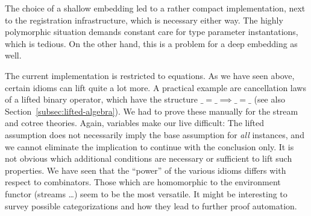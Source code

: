 The choice of a shallow embedding led to a rather compact implementation,
next to the registration infrastructure, which is necessary either way.
The highly polymorphic situation demands constant care for type parameter
instantations, which is tedious.
On the other hand, this is a problem for a deep embedding as well.

The current implementation is restricted to equations.
As we have seen above, certain idioms can lift quite a lot more.
A practical example are cancellation laws of a lifted binary operator, which
have the structure $\_ = \_ \implies \_ = \_$ (see also
Section~\ref{subsec:lifted-algebra}).
We had to prove these manually for the stream and cotree theories.
Again, variables make our live difficult:
The lifted assumption does not necessarily imply the base assumption for
\emph{all} instances, and we cannot eliminate the implication to continue
with the conclusion only.
It is not obvious which additional conditions are necessary or sufficient to
lift such properties.
We have seen that the ``power'' of the various idioms differs with respect to
combinators.
Those which are homomorphic to the environment functor (streams \dots) seem to
be the most versatile.
It might be interesting to survey possible categorizations and how they lead
to further proof automation.

